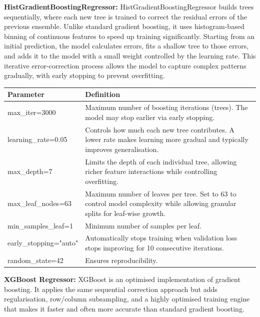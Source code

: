 \vspace{-12pt}
\noindent
\textbf{HistGradientBoostingRegressor:}
HistGradientBoostingRegressor builds trees sequentially, where each new tree is trained to correct the residual errors of the previous ensemble. Unlike standard gradient boosting, it uses histogram-based binning of continuous features to speed up training significantly. Starting from an initial prediction, the model calculates errors, fits a shallow tree to those errors, and adds it to the model with a small weight controlled by the learning rate. This iterative error-correction process allows the model to capture complex patterns gradually, with early stopping to prevent overfitting.

\begin{table}[H]
    \centering
    \begin{tabular}{||l|p{12cm}||}
    \hline
    \hline
        Parameter & Definition \\
        \hline
        \hline
        max\_iter=3000 & Maximum number of boosting iterations (trees). The model may stop earlier via early stopping. \\
        \hline
        learning\_rate=0.05 & Controls how much each new tree contributes. A lower rate makes learning more gradual and typically improves generalisation. \\
        \hline
        max\_depth=7 & Limits the depth of each individual tree, allowing richer feature interactions while controlling overfitting. \\
        \hline
        max\_leaf\_nodes=63 & Maximum number of leaves per tree. Set to 63 to control model complexity while allowing granular splits for leaf-wise growth. \\
        \hline
        min\_samples\_leaf=1 & Minimum number of samples per leaf. \\
        \hline
        early\_stopping="auto" & Automatically stops training when validation loss stops improving for 10 consecutive iterations. \\
        \hline
        random\_state=42 & Ensures reproducibility. \\
        \hline
        \hline
    \end{tabular}
\end{table}

\vspace{-12pt}
\noindent
\textbf{XGBoost Regressor:}
XGBoost is an optimised implementation of gradient boosting. It applies the same sequential correction approach but adds regularisation, row/column subsampling, and a highly optimised training engine that makes it faster and often more accurate than standard gradient boosting.

